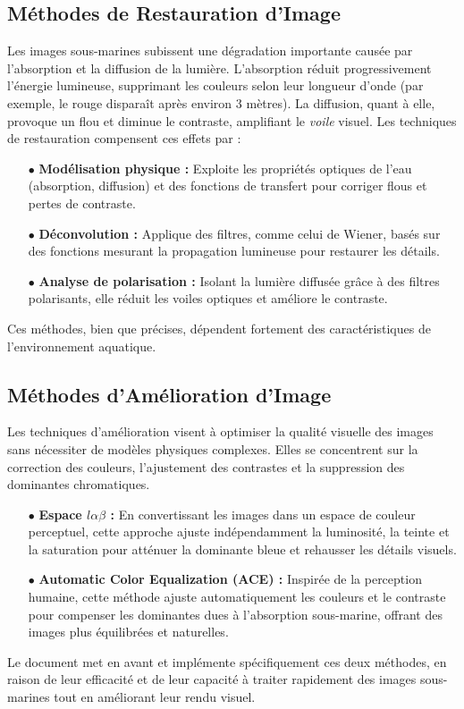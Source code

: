 \documentclass[10pt, a4paper]{extarticle}
\numberwithin{equation}{section}
\numberwithin{figure}{section}
\begin{document}
\subsection{Méthodes de Restauration d'Image}
\par Les images sous-marines subissent une dégradation importante causée par l'absorption et la diffusion de la lumière. L'absorption réduit progressivement l'énergie lumineuse, supprimant les couleurs selon leur longueur d'onde (par exemple, le rouge disparaît après environ 3 mètres). La diffusion, quant à elle, provoque un flou et diminue le contraste, amplifiant le \textit{voile} visuel. Les techniques de restauration compensent ces effets par :
\begin{itemize}
\item[$\bullet$] \textbf{Modélisation physique :} Exploite les propriétés optiques de l'eau (absorption, diffusion) et des fonctions de transfert pour corriger flous et pertes de contraste.
\item[$\bullet$] \textbf{Déconvolution :} Applique des filtres, comme celui de Wiener, basés sur des fonctions mesurant la propagation lumineuse pour restaurer les détails.
\item[$\bullet$] \textbf{Analyse de polarisation :} Isolant la lumière diffusée grâce à des filtres polarisants, elle réduit les voiles optiques et améliore le contraste.
\end{itemize}
Ces méthodes, bien que précises, dépendent fortement des caractéristiques de l’environnement aquatique.

\subsection{Méthodes d'Amélioration d'Image}

\par Les techniques d’amélioration visent à optimiser la qualité visuelle des images sans nécessiter de modèles physiques complexes. Elles se concentrent sur la correction des couleurs, l'ajustement des contrastes et la suppression des dominantes chromatiques.
\begin{itemize}
\item[$\bullet$] \textbf{Espace $l\alpha\beta$ :} En convertissant les images dans un espace de couleur perceptuel, cette approche ajuste indépendamment la luminosité, la teinte et la saturation pour atténuer la dominante bleue et rehausser les détails visuels.
\item[$\bullet$] \textbf{Automatic Color Equalization (ACE) :} Inspirée de la perception humaine, cette méthode ajuste automatiquement les couleurs et le contraste pour compenser les dominantes dues à l’absorption sous-marine, offrant des images plus équilibrées et naturelles.
\end{itemize}
Le document met en avant et implémente spécifiquement ces deux méthodes, en raison de leur efficacité et de leur capacité à traiter rapidement des images sous-marines tout en améliorant leur rendu visuel.
\end{document}
